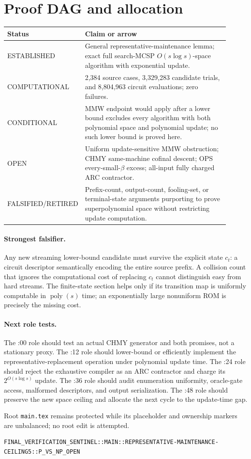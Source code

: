 \documentclass[11pt]{article}
\begin{document}
\section{Proof DAG and allocation}
\begin{center}
\begin{tabular}{p{0.18\linewidth}p{0.73\linewidth}}
\toprule
Status & Claim or arrow \\
\midrule
ESTABLISHED & General representative-maintenance lemma; exact full search-MCSP $O(s\log s)$-space algorithm with exponential update. \\
COMPUTATIONAL & 2,384 source cases, 3,329,283 candidate trials, and 8,804,963 circuit evaluations; zero failures. \\
CONDITIONAL & MMW endpoint would apply after a lower bound excludes every algorithm with both polynomial space and polynomial update; no such lower bound is proved here. \\
OPEN & Uniform update-sensitive MMW obstruction; CHMY same-machine cofinal descent; OPS every-small-$\beta$ excess; all-input fully charged ARC contractor. \\
FALSIFIED/RETIRED & Prefix-count, output-count, fooling-set, or terminal-state arguments purporting to prove superpolynomial space without restricting update computation. \\
\bottomrule
\end{tabular}
\end{center}

\paragraph{Strongest falsifier.}
Any new streaming lower-bound candidate must survive the explicit state
$c_t$: a circuit descriptor semantically encoding the entire source prefix.
A collision count that ignores the computational cost of replacing $c_t$
cannot distinguish easy from hard streams.  The finite-state section helps
only if its transition map is uniformly computable in $\operatorname{poly}(s)$
time; an exponentially large nonuniform ROM is precisely the missing cost.

\paragraph{Next role tests.}
The :00 role should test an actual CHMY generator and both promises, not a
stationary proxy.  The :12 role should lower-bound or efficiently implement
the representative-replacement operation under polynomial update time.  The
:24 role should reject the exhaustive compiler as an ARC contractor and charge
its $2^{O(s\log s)}$ update.  The :36 role should audit enumeration uniformity,
oracle-gate access, malformed descriptors, and output serialization.  The :48
role should preserve the new space ceiling and allocate the next cycle to the
update-time gap.

Root \texttt{main.tex} remains protected while its placeholder and ownership
markers are unbalanced; no root edit is attempted.

\vfill
\noindent\texttt{FINAL\_VERIFICATION\_SENTINEL::MAIN::REPRESENTATIVE-MAINTENANCE-CEILING5::P\_VS\_NP\_OPEN}
\end{document}
